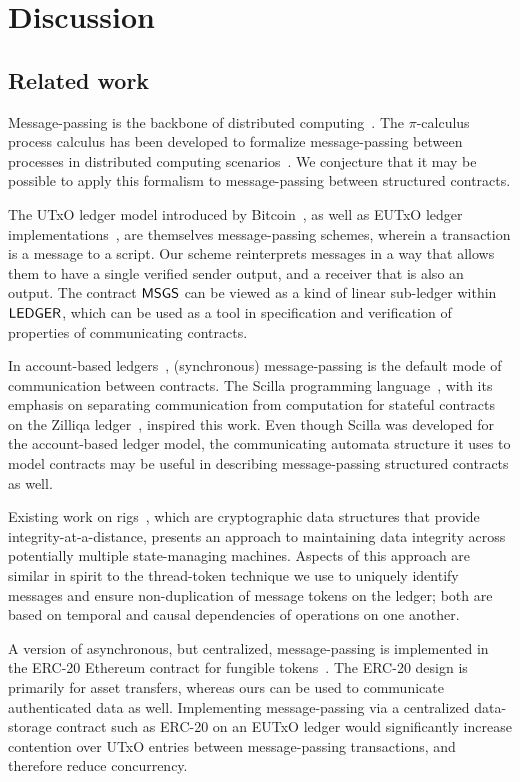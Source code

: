 \section{Discussion}
\label{sec:discussion}

\subsection{Related work}
\label{sec:related}

Message-passing is the backbone of distributed computing~\cite{distributed,design}.
The $\pi$-calculus process calculus has been developed to formalize
message-passing between processes in distributed computing scenarios~\cite{picalc}.
We conjecture that it may be possible to apply this formalism to
message-passing between structured contracts.

The UTxO ledger model introduced by Bitcoin~\cite{bitcoin},
as well as EUTxO ledger implementations~\cite{ergo},
are themselves message-passing schemes, wherein a transaction is a message to a script.
Our scheme reinterprets messages in a way that allows them to have a single verified
sender output, and a receiver that is also an output. The contract $\mathsf{MSGS}$
can be viewed as a kind of linear sub-ledger within $\mathsf{LEDGER}$, which can be
used as a tool in specification and verification of properties of communicating contracts.

In account-based ledgers~\cite{ethereum,tezos,zilliqa}, (synchronous)
message-passing is the default mode of communication between contracts.
The Scilla programming language~\cite{scilla}, with its emphasis on separating
communication from computation for stateful contracts on the Zilliqa ledger~\cite{zilliqa},
inspired this work.
Even though Scilla was developed for the account-based ledger model, the communicating
automata structure it uses to model contracts may be useful in
describing message-passing structured contracts as well.

Existing work on rigs~\cite{rigs}, which are cryptographic data structures that
provide integrity-at-a-distance, presents an approach to maintaining data
integrity across potentially multiple state-managing machines.
Aspects of this approach are similar in spirit to the thread-token technique
we use to uniquely identify messages and ensure non-duplication of message tokens on
the ledger; both are based on temporal and causal dependencies of operations on one another.

A version of asynchronous, but centralized, message-passing is implemented
in the ERC-20 Ethereum contract for fungible tokens~\cite{erc20}.
The ERC-20 design is primarily for asset transfers, whereas ours can be used to communicate
authenticated data as well. Implementing message-passing
via a centralized data-storage contract such as ERC-20 on an EUTxO ledger would significantly
increase contention over UTxO entries between message-passing transactions, and therefore
reduce concurrency.

